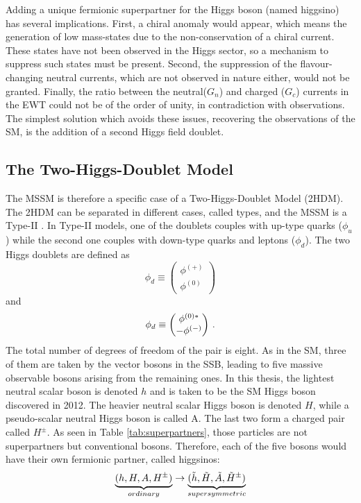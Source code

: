 Adding a unique fermionic superpartner for the Higgs boson (named higgsino) has several implications. First, a chiral anomaly would appear, which means the generation of low mass-states due to the non-conservation of a chiral current. These states have not been observed in the Higgs sector, so a mechanism to suppress such states must be present. Second, the suppression of the flavour-changing neutral currents, which are not observed in nature either, would not be granted. Finally, the ratio between the neutral($G_n$) and charged ($G_c$) currents in the EWT could not be of the order of unity, in contradiction with observations. The simplest solution which avoids these issues, recovering the observations of the SM, is the addition of a second Higgs field doublet. 

\subsection{The Two-Higgs-Doublet Model}

The MSSM is therefore a specific case of a Two-Higgs-Doublet Model (2HDM). The 2HDM can be separated in different cases, called types, and the MSSM is a Type-II \cite{Gunion:425736,PhysRevD.41.3421}. In Type-II models, one of the doublets couples with up-type quarks ($\phi_u$) while the second one couples with down-type quarks and leptons ($\phi_d$). The two Higgs doublets are defined as
\begin{equation}
    \phi_d \equiv \begin{pmatrix} \phi^{(+)} \\ \phi^{(0)} \end{pmatrix}
\end{equation}
and
\begin{equation}
    \phi_d \equiv \begin{pmatrix} \phi^{(0)*} \\ -\phi^{(-)} \end{pmatrix} \mend
\end{equation}
The total number of degrees of freedom of the pair is eight. As in the SM, three of them are taken by the vector bosons in the SSB, leading to five massive observable bosons arising from the remaining ones. In this thesis, the lightest neutral scalar boson is denoted $h$ and is taken to be the SM Higgs boson discovered in 2012. The heavier neutral scalar Higgs boson is denoted $H$, while a pseudo-scalar neutral Higgs boson is called A. The last two form a charged pair called $H^{\pm}$. As seen in Table \ref{tab:superpartners}, those particles are not superpartners but conventional bosons. Therefore, each of the five bosons would have their own fermionic partner, called higgsinos:
\begin{equation}
    \underbrace{(h, H, A, H^{\pm})}_{ordinary} \rightarrow \underbrace{(\Tilde{h}, \Tilde{H}, \Tilde{A}, \Tilde{H}^{\pm})}_{supersymmetric}
\end{equation}

